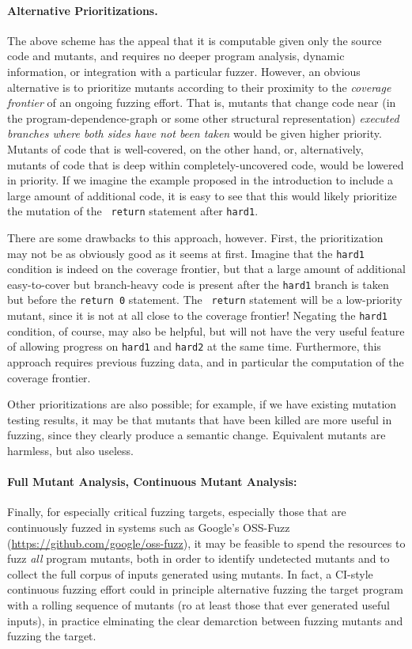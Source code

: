 \paragraph{Alternative Prioritizations.}  The above scheme has the
appeal that it is computable given only the source code and mutants,
and requires no deeper program analysis, dynamic information, or
integration with a particular fuzzer.  However, an obvious alternative
is to prioritize mutants according to their proximity to the
\emph{coverage frontier} of an ongoing fuzzing effort.  That is,
mutants that change code near (in the program-dependence-graph or some other structural representation)  \emph{executed branches where both sides have not been taken} would be given higher
priority.  Mutants of code that is well-covered, on the other hand, or, alternatively, mutants of
code that is deep within completely-uncovered code,
would be lowered in priority.  If we imagine the example proposed in the
introduction to include a large amount of additional code, it is easy
to see that this would likely prioritize the mutation of the {\tt
  return} statement after {\tt hard1}.

There are some drawbacks to this approach, however.  First, the
prioritization may not be as obviously good as it seems at first.
Imagine that the {\tt hard1} condition is indeed on the coverage
frontier, but that a large amount of additional easy-to-cover but branch-heavy code  is present after
the {\tt hard1} branch is taken but before the {\tt return 0} statement.  The {\tt
  return} statement will be a low-priority mutant, since it is not at
all close to the coverage frontier!  Negating the {\tt hard1}
condition, of course, may also be helpful, but will not have the very
useful feature of allowing progress on {\tt hard1} and {\tt hard2} at
the same time.  Furthermore, this approach requires previous fuzzing
data, and in particular the computation of the coverage frontier.

Other prioritizations are also possible; for example, if we have
existing mutation testing results, it may be that mutants that have
been killed are more useful in fuzzing, since they clearly produce a
semantic change.  Equivalent mutants are harmless, but also useless.

\paragraph{Full Mutant Analysis, Continuous Mutant Analysis:} Finally, for especially critical fuzzing targets, especially those
that are continuously fuzzed in systems such as Google's OSS-Fuzz
(\url{https://github.com/google/oss-fuzz}), it may be feasible to
spend the resources to fuzz \emph{all} program mutants, both in order
to identify undetected mutants and to collect the full corpus of
inputs generated using mutants.  In fact, a CI-style continuous
fuzzing effort could in principle alternative fuzzing the target
program with a rolling sequence of mutants (ro at least those that ever generated useful
inputs), in practice elminating the clear demarction between fuzzing
mutants and fuzzing the target.

